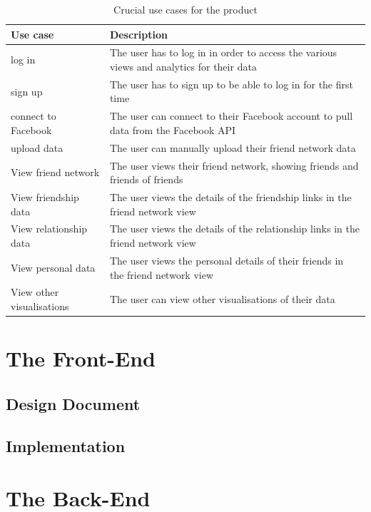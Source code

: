 \documentclass[12pt,onecolumn]{article}
\begin{document}
	\begin{table} [htbp]
		\caption{Crucial use cases for the product}
		\label{usecase}
		\centering
		\begin{tabular}{p{}|p{}}
		\hline
		\textbf{Use case} & \textbf{Description} \\ \hline
		log in & The user has to log in in order to access the various views and analytics for their data \\
		sign up & The user has to sign up to be able to log in for the first time \\
		connect to Facebook & The user can connect to their Facebook account to pull data from the Facebook API \\
		upload data & The user can manually upload their friend network data \\
		View friend network & The user views their friend network, showing friends and friends of friends \\
		View friendship data & The user views the details of the friendship links in the friend network view \\
		View relationship data & The user views the details of the relationship links in the friend network view \\
		View personal data & The user views the personal details of their friends in the friend network view \\
		View other visualisations & The user can view other visualisations of their data \\ \hline
		\end{tabular}
	\end{table}

	

\section{The Front-End}	

	\subsection{Design Document} %

	\subsection{Implementation} %

\section{The Back-End}
\end{document}
